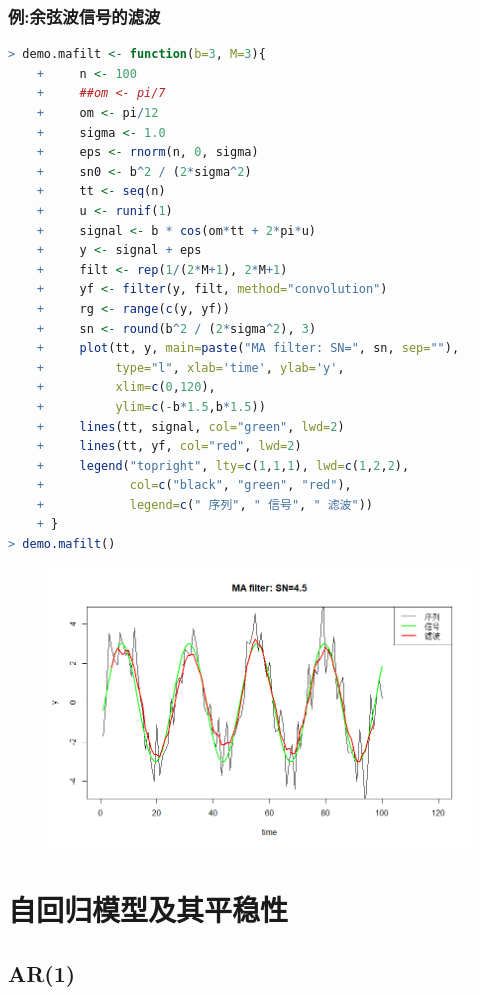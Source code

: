\documentclass[11pt,a4paper,oneside]{book}
\begin{document}
\subsection{例:余弦波信号的滤波}
\begin{lstlisting}[language=r]
> demo.mafilt <- function(b=3, M=3){
	+     n <- 100
	+     ##om <- pi/7
	+     om <- pi/12
	+     sigma <- 1.0
	+     eps <- rnorm(n, 0, sigma)
	+     sn0 <- b^2 / (2*sigma^2)
	+     tt <- seq(n)
	+     u <- runif(1)
	+     signal <- b * cos(om*tt + 2*pi*u)
	+     y <- signal + eps
	+     filt <- rep(1/(2*M+1), 2*M+1)
	+     yf <- filter(y, filt, method="convolution")
	+     rg <- range(c(y, yf))
	+     sn <- round(b^2 / (2*sigma^2), 3)
	+     plot(tt, y, main=paste("MA filter: SN=", sn, sep=""),
	+          type="l", xlab='time', ylab='y',
	+          xlim=c(0,120),
	+          ylim=c(-b*1.5,b*1.5))
	+     lines(tt, signal, col="green", lwd=2)
	+     lines(tt, yf, col="red", lwd=2)
	+     legend("topright", lty=c(1,1,1), lwd=c(1,2,2),
	+            col=c("black", "green", "red"),
	+            legend=c(" 序列", " 信号", " 滤波"))
	+ }
> demo.mafilt()
\end{lstlisting}
\begin{figure}[H]
	\centering
	\includegraphics[width=\textwidth]{15.png}
\end{figure}

\chapter{自回归模型及其平稳性}
\section{AR(1)}
\end{document}
